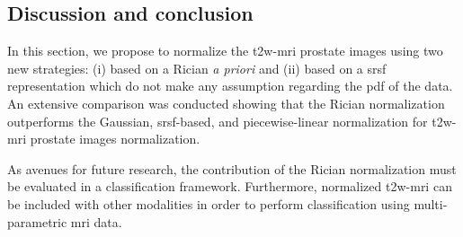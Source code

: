 \subsection{Discussion and conclusion}\label{subsec:chp5:T2-norm:dis-con}
In this section, we propose to normalize the \ac{t2w}-\ac{mri} prostate images using two new strategies: (i) based on a Rician \textit{a priori} and (ii) based on a \ac{srsf} representation which do not make any assumption regarding the \ac{pdf} of the data.
An extensive comparison was conducted showing that the Rician normalization outperforms the Gaussian, \ac{srsf}-based, and piecewise-linear normalization for \ac{t2w}-\ac{mri} prostate images normalization.

As avenues for future research, the contribution of the Rician normalization must be evaluated in a classification framework. Furthermore, normalized \ac{t2w}-\ac{mri} can be included with other modalities in order to perform classification using multi-parametric \ac{mri} data.

